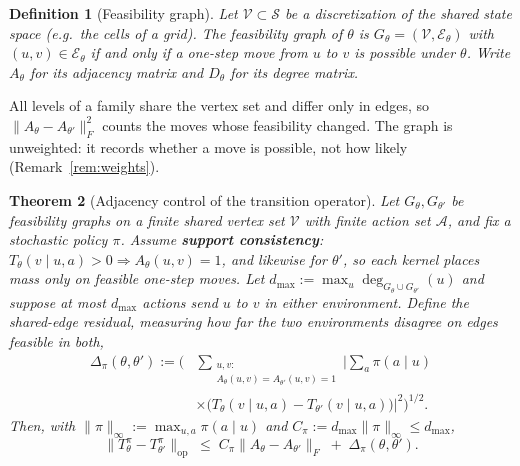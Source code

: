 \documentclass[twoside]{article}
\newcommand{\Tdist}{T}
\newcommand{\statespace}{\mathcal{S}}
\newtheorem{theorem}{Theorem}
\newtheorem{definition}[theorem]{Definition}
\begin{document}
\begin{definition}[Feasibility graph]
\label{def:kinograph}
Let $\mathcal{V} \subset \statespace$ be a discretization of the shared state space (e.g.\ the cells of a grid). The feasibility graph of $\theta$ is $G_\theta = (\mathcal{V}, \mathcal{E}_\theta)$ with $(u,v) \in \mathcal{E}_\theta$ if and only if a one-step move from $u$ to $v$ is possible under $\theta$. Write $A_\theta$ for its adjacency matrix and $D_\theta$ for its degree matrix.
\end{definition}

All levels of a family share the vertex set and differ only in edges, so $\|A_\theta - A_{\theta'}\|_F^2$ counts the moves whose feasibility changed. The graph is unweighted: it records whether a move is possible, not how likely (Remark~\ref{rem:weights}).

\begin{theorem}[Adjacency control of the transition operator]
\label{prop:adjacency-control}
Let $G_\theta, G_{\theta'}$ be feasibility graphs on a finite shared vertex set $\mathcal V$ with finite action set $\mathcal A$, and fix a stochastic policy $\pi$. Assume \textbf{support consistency}: $\Tdist_\theta(v\mid u,a)>0 \Rightarrow A_\theta(u,v)=1$, and likewise for $\theta'$, so each kernel places mass only on feasible one-step moves. Let $d_{\max} := \max_{u} \deg_{G_\theta\cup G_{\theta'}}(u)$ and suppose at most $d_{\max}$ actions send $u$ to $v$ in either environment. Define the \emph{shared-edge residual}, measuring how far the two environments disagree on edges feasible in \emph{both},
\begin{equation}\label{eq:residual}
\begin{split}
    \Delta_\pi(\theta,\theta')
    :=
    \Bigg(
    &\sum_{\substack{u,v:\\ A_\theta(u,v)=A_{\theta'}(u,v)=1}}
    \Big|
        \sum_{a}
        \pi(a\mid u)
        \\
        &\times\big(
            \Tdist_\theta(v\mid u,a) - \Tdist_{\theta'}(v\mid u,a)
        \big)
    \Big|^{2}
    \Bigg)^{1/2}.
\end{split}
\end{equation}
Then, with $\|\pi\|_\infty := \max_{u,a}\pi(a\mid u)$ and $C_\pi := d_{\max}\|\pi\|_\infty \le d_{\max}$,
\begin{equation}\label{eq:adjacency-control}
    \big\|T^\pi_\theta - T^\pi_{\theta'}\big\|_{\mathrm{op}}
    \;\le\;
    C_\pi \big\|A_\theta-A_{\theta'}\big\|_F
    \;+\;
    \Delta_\pi(\theta,\theta').
\end{equation}
\end{theorem}
\end{document}
